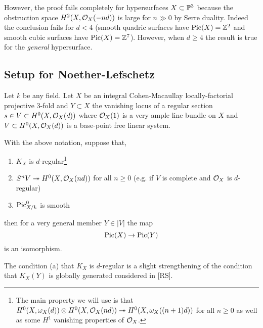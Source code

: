 \documentclass[12pt]{article}
\begin{document}
\begin{rmk}
However, the proof fails completely for hypersurfaces $X \subset \P^3$ because the obstruction space $H^2(X, \struct{X}(-nd))$ is large for $n \gg 0$ by Serre duality. Indeed the conclusion fails for $d < 4$ (smooth quadric surfaces have $\Pic{X} = \Z^2$ and smooth cubic surfaces have $\Pic{X} = \Z^7$). However, when $d \ge 4$ the result is true for the \textit{general} hypersurface. 
\end{rmk}

\subsection{Setup for Noether-Lefschetz}

\newcommand{\cY}{\mathcal{Y}}
\newcommand{\cV}{\mathcal{V}}

Let $k$ be any field. Let $X$ be an integral Cohen-Macaullay locally-factorial projective 3-fold and $Y \subset X$ the vanishing locus of a regular section $s \in V \subset H^0(X, \struct{X}(d))$ where $\struct{X}(1)$ is a very ample line bundle on $X$ and $V \subset H^0(X, \struct{X}(d))$ is a base-point free linear system. 

\begin{theorem}
With the above notation, suppose that,
\begin{enumerate}
\item $K_X$ is $d$-regular\footnote{The main property we will use is that $H^0(X, \omega_X(d)) \ot H^0(X, \struct{X}(nd)) \onto H^0(X, \omega_X((n+1)d))$ for all $n \ge 0$ as well as some $H^1$ vanishing properties of $\struct{X}$.}
\item $S^n V \onto H^0(X, \struct{X}(nd))$ for all $n \ge 0$ (e.g. if $V$ is complete and $\struct{X}$ is $d$-regular)
\item $\fPic_{X/k}^0$ is smooth
\end{enumerate}
then for a very general member $Y \in |V|$ the map
\[ \Pic{X} \to \Pic{Y} \]
is an isomorphism. 
\end{theorem}

\begin{rmk}
The condition (a) that $K_X$ is $d$-regular is a slight strengthening of the condition that $K_X(Y)$ is globally generated considered in [RS].
\end{rmk}
\end{document}
